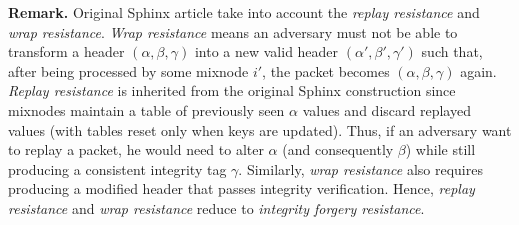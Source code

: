 \noindent\textbf{Remark.}\label{replay_resistance}\label{wrap_resistance}
Original Sphinx article take into account the \emph{replay resistance} and \emph{wrap resistance}.
\emph{Wrap resistance} means an adversary must not be able to transform a header $(\alpha, \beta, \gamma)$ into a new valid header $(\alpha', \beta', \gamma')$ such that, after being processed by some mixnode $i'$, the packet becomes $(\alpha, \beta, \gamma)$ again.  
\emph{Replay resistance} is inherited from the original Sphinx construction since mixnodes maintain a table of previously seen $\alpha$ values and discard replayed values (with tables reset only when keys are updated).
Thus, if an adversary want to replay a packet, he would need to alter $\alpha$ (and consequently $\beta$) while still producing a consistent integrity tag $\gamma$. %
Similarly, \emph{wrap resistance} also requires producing a modified header that passes integrity verification.
Hence, \emph{replay resistance} and \emph{wrap resistance} reduce to \emph{integrity forgery resistance}. 






